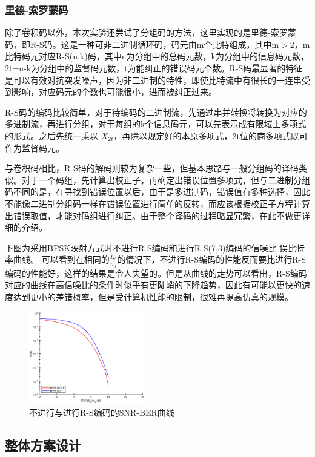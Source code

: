 \subsubsection{里德-索罗蒙码}

除了卷积码以外，本次实验还尝试了分组码的方法，这里实现的是里德-索罗蒙码，即R-S码。这是一种可非二进制循环码，码元由m个比特组成，其中m$>$2，m比特码元对应R-S(n,k)码，其中n为分组中的总码元数，k为分组中的信息码元数，2t=n-k为分组中的监督码元数，t为能纠正的错误码元个数。R-S码最显著的特征是可以有效对抗突发噪声，因为非二进制的特性，即使比特流中有很长的一连串受到影响，对应码元的个数也可能很小，进而被纠正过来。

R-S码的编码比较简单，对于待编码的二进制流，先通过串并转换将转换为对应的多进制流，再进行分组，对于每组的k个信息码元，可以先表示成有限域上多项式的形式。之后先统一乘以 $X_{2t}$，再除以规定好的本原多项式，2t位的商多项式既可作为监督码元。
    
与卷积码相比，R-S码的解码则较为复杂一些，但基本思路与一般分组码的译码类似。对于一个码组，先计算出校正子，再确定出错误位置多项式，但与二进制分组码不同的是，在寻找到错误位置以后，由于是多进制码，错误值有多种选择，因此不能像二进制分组码一样在错误位置进行简单的反转，而应该根据校正子方程计算出错误取值，才能对码组进行纠正。由于整个译码的过程略显冗繁，在此不做更详细的介绍。

下图为采用BPSK映射方式时不进行R-S编码和进行R-S(7,3)编码的信噪比-误比特率曲线。 可以看到在相同的$\frac{E_b}{n_0}$的情况下，不进行R-S编码的性能反而要比进行R-S编码的性能好，这样的结果是令人失望的。但是从曲线的走势可以看出，R-S编码对应的曲线在高信噪比的条件时似乎有更陡峭的下降趋势，因此有可能以更快的速度达到更小的差错概率，但是受计算机性能的限制，很难再提高仿真的规模。

\begin{figure}[h]
    \centering
    \includegraphics[width=0.45\textwidth]{./pic/RS_SNR_BER.eps}
    \caption{不进行与进行R-S编码的SNR-BER曲线}
\end{figure}

\subsection{整体方案设计}

